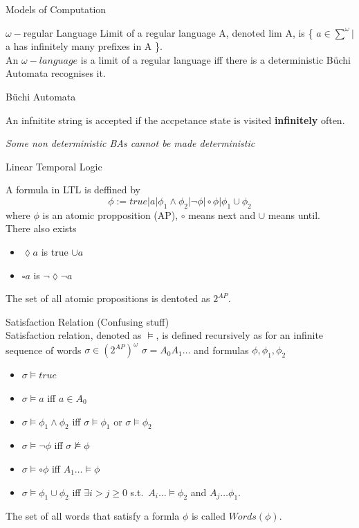 \documentclass[12pt, letterpaper]{article}
\begin{document}
\begin{section}{Models of Computation}
\begin{subsection}{\(\omega-\)regular Language}
    Limit of a regular language A, denoted lim A, is
    \{ \(a \in \sum^{\omega} |\) a has infinitely many prefixes in A \}. \\
    An \(\omega-language\) is a limit of a regular language iff there is a
    deterministic B\"uchi Automata recognises it.

  \end{subsection}

  \begin{subsection}{B\"uchi Automata}

    An infnitite string is accepted if the accpetance state is visited
    \textbf{infinitely} often.

    \emph{Some non deterministic BAs cannot be made deterministic}

  \end{subsection}

  \begin{subsection}{Linear Temporal Logic}

    A formula in LTL is deffined by
    \[\phi := true | a | \phi_{1} \land \phi_{2} | \lnot \phi | \circ \phi | \phi_{1} \cup \phi_{2}\]
    where \(\phi\) is an atomic propposition (AP), \(\circ\) means next and \(\cup\) means until. \\
    There also exists
    \begin{itemize}
      \item \(\lozenge a\) is true \(\cup a\)
      \item \(\square a\) is \(\lnot \lozenge \lnot a\)
    \end{itemize}

    The set of all atomic propositions is dentoted as \(2^{AP}\).

    \begin{subsubsection}{Satisfaction Relation}
      (Confusing stuff) \\
      Satisfaction relation, denoted as \(\models\), is defined recursively as for
      an infinite sequence of words \(\sigma \in (2^{AP})^{\omega}\)
      \(\sigma = A_{0}A_{1} \dots\) and formulas
      \(\phi, \phi_{1}, \phi_{2}\)
      \begin{itemize}
        \item \(\sigma \models true\)
        \item \(\sigma \models a\) iff \(a \in A_{0}\)
        \item \(\sigma \models \phi_{1} \land \phi_{2}\) iff
        \(\sigma \models \phi_{1}\) or \(\sigma \models \phi_{2}\)
        \item \(\sigma \models \lnot \phi\) iff \(\sigma \not\models \phi\)
        \item \(\sigma \models \circ \phi\) iff \(A_{1} \dots \models \phi\)
        \item \(\sigma \models \phi_{1} \cup \phi_{2}\) iff
        \(\exists i > j \geq 0\) s.t.\ \(A_{i} \dots \models \phi_{2}\) and
        \(A_{j} \dots \phi_{1}\).
      \end{itemize}
      The set of all words that satisfy a formla \(\phi\) is called
      \(Words(\phi)\).


\end{subsubsection}
\end{subsection}
\end{section}
\end{document}
